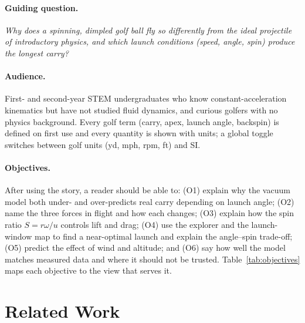 \documentclass[11pt]{article}
\begin{document}
\paragraph{Guiding question.} \emph{Why does a spinning, dimpled golf ball fly so differently from
the ideal projectile of introductory physics, and which launch conditions (speed, angle, spin)
produce the longest carry?}

\paragraph{Audience.} First- and second-year STEM undergraduates who know constant-acceleration
kinematics but have not studied fluid dynamics, and curious golfers with no physics background.
Every golf term (carry, apex, launch angle, backspin) is defined on first use and every quantity is
shown with units; a global toggle switches between golf units (yd, mph, rpm, ft) and SI.

\paragraph{Objectives.} After using the story, a reader should be able to:
(O1) explain why the vacuum model both under- and over-predicts real carry depending on launch
angle; (O2) name the three forces in flight and how each changes; (O3) explain how the spin ratio
$S=r\omega/u$ controls lift and drag; (O4) use the explorer and the launch-window map to find a
near-optimal launch and explain the angle--spin trade-off; (O5) predict the effect of wind and
altitude; and (O6) say how well the model matches measured data and where it should not be trusted.
Table~\ref{tab:objectives} maps each objective to the view that serves it.

\section{Related Work}
\end{document}
